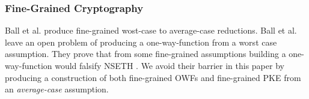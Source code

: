 \subsubsection{Fine-Grained Cryptography}
Ball et al. \cite{avgCaseFineGrained,eprintAvgCaseFG} produce fine-grained wost-case to average-case reductions. Ball et al. leave an open problem of producing a one-way-function from a worst case assumption. They prove that from some fine-grained assumptions building a one-way-function would falsify NSETH \cite{CarmosinoGIMPS16}\cite{avgCaseFineGrained}.
We avoid their barrier in this paper by producing a construction of both fine-grained OWFs and fine-grained PKE from an \emph{average-case} assumption.






